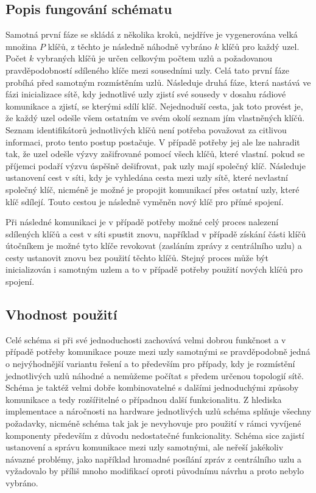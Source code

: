 \documentclass[11pt,final,twoside]{fithesis2}
\begin{document}
\subsection{Popis fungování schématu}
Samotná první fáze se skládá z několika kroků, nejdříve je vygenerována velká množina $P$ klíčů, z těchto je následně náhodně vybráno $k$ klíčů pro každý
uzel. Počet $k$ vybraných klíčů je určen celkovým počtem uzlů a požadovanou pravděpodobností sdíleného klíče mezi sousedními uzly. Celá tato první fáze 
probíhá před samotným rozmístěním uzlů. Následuje druhá fáze, která nastává ve fázi inicializace sítě, kdy jednotlivé uzly zjistí své sousedy v dosahu 
rádiové komunikace a zjistí, se kterými sdílí klíč. Nejednoduší cesta, jak toto provést je, že každý uzel odešle všem ostatním ve svém okolí seznam jím 
vlastněných klíčů. Seznam identifikátorů jednotlivých klíčů není potřeba považovat za citlivou informaci, proto tento postup postačuje. V případě potřeby 
jej ale lze nahradit tak, že uzel odešle výzvy zašifrované pomocí všech klíčů, které vlastní. pokud se příjemci podaří výzvu úspěšně dešifrovat, pak
uzly mají společný klíč. Následuje ustanovení cest v síti, kdy je vyhledána cesta mezi uzly sítě, které nevlastní společný klíč, nicméně je možné je propojit 
komunikací přes ostatní uzly, které klíč sdílejí. Touto cestou je následně vyměněn nový klíč pro přímé spojení. 

Při následné komunikaci je v případě potřeby možné celý proces nalezení sdílených klíčů a cest v síti spustit znovu, například v případě získání části klíčů útočníkem
je možné tyto klíče revokovat (zasláním zprávy z centrálního uzlu) a cesty ustanovit znovu bez použití těchto klíčů. Stejný proces může být inicializován i samotným uzlem
a to v případě potřeby použití nových klíčů pro spojení. 

\subsection{Vhodnost použití}
Celé schéma si při své jednoduchosti zachovává velmi dobrou funkčnost a v případě potřeby komunikace pouze mezi uzly samotnými se pravděpodobně jedná o nejvýhodnější
variantu řešení a to především pro případy, kdy je rozmístění jednotlivých uzlů náhodné a nemůžeme počítat s předem určenou topologií sítě. Schéma je taktéž velmi dobře kombinovatelné
s dalšími jednoduchými způsoby komunikace a tedy rozšířitelné o případnou další funkcionalitu. Z hlediska implementace a náročnosti na hardware jednotlivých uzlů schéma
splňuje všechny požadavky, nicméně schéma tak jak je nevyhovuje pro použití v rámci vyvíjené komponenty především z důvodu nedostatečné funkcionality. Schéma sice zajistí ustanovení
a správu komunikace mezi uzly samotnými, ale neřeší jakékoliv návazné problémy, jako například hromadné posílání zpráv z centrálního uzlu a vyžadovalo by příliš mnoho modifikací oproti 
původnímu návrhu a proto nebylo vybráno.
\end{document}
